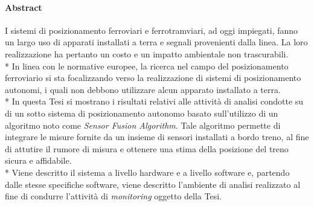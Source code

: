 \paragraph{Abstract}
I sistemi di posizionamento ferroviari e ferrotramviari, ad oggi impiegati, fanno un largo uso di apparati installati a terra e segnali provenienti dalla linea. La loro realizzazione ha pertanto un costo e un impatto ambientale non trascurabili.\\*
In linea con le normative europee, la ricerca nel campo del posizionamento ferroviario si sta focalizzando verso la realizzazione di sistemi di posizionamento autonomi, i quali non debbono utilizzare alcun apparato installato a terra.\\*
In questa Tesi si mostrano i risultati relativi alle attivit\`a di analisi condotte su di un sotto sistema di posizionamento autonomo basato sull'utilizzo di un algoritmo noto come \emph{Sensor Fusion Algorithm}. Tale algoritmo permette di integrare le misure fornite da un insieme di sensori installati a bordo treno, al fine di attutire il rumore di misura e ottenere una stima della posizione del treno sicura e affidabile.\\*
Viene descritto il sistema a livello hardware e a livello software e, partendo dalle stesse specifiche software, viene descritto l'ambiente di analisi realizzato al fine di condurre l'attivit\`a di \emph{monitoring} oggetto della Tesi.